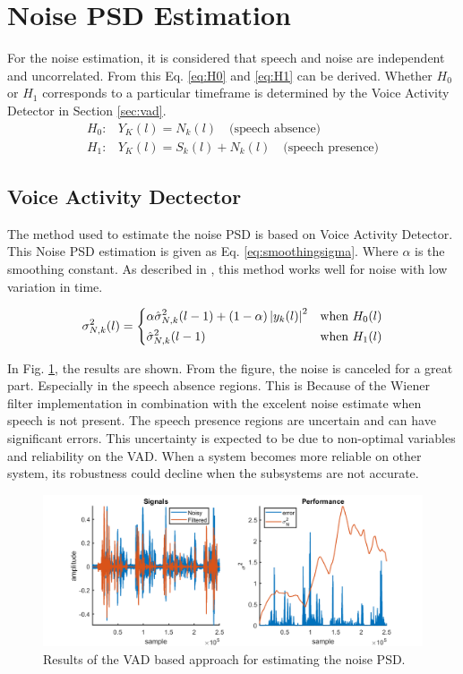 \section{Noise PSD Estimation} \label{sec:noise_estimation}
For the noise estimation, it is considered that speech and noise are independent and uncorrelated. From this Eq. \ref{eq:H0} and \ref{eq:H1} can be derived. Whether $H_0$ or $H_1$ corresponds to a particular timeframe is determined by the Voice Activity Detector in Section \ref{sec:vad}.
\begin{align}
  H_{0}: & Y_{K}(l) = N_{k}(l) \quad \text{(speech absence)}
  \label{eq:H0} \\
  H_{1}: & Y_{K}(l) = S_{k}(l) + N_{k}(l) \quad \text{(speech presence)}
  \label{eq:H1}
\end{align}

\subsection{Voice Activity Dectector}
The method used to estimate the noise PSD is based on Voice Activity Detector. This Noise PSD estimation is given as Eq. \ref{eq:smoothingsigma}. Where $\alpha$ is the smoothing constant. As described in \cite{Hendriks}, this method works well for noise with low variation in time.

\begin{equation}
  \sigma_{N,k}^{2}(l)=
  \begin{dcases}
      \alpha \hat \sigma_{N,k}^{2}(l-1) + (1-\alpha)\abs{y_{k}(l)}^{2} & \text{when } H_{0}(l)\\
      \hat \sigma_{N,k}^{2}(l-1) & \text{when } H_{1}(l)
  \end{dcases}
  \label{eq:smoothingsigma}
\end{equation}

In Fig. \ref{fig:VADnoise}, the results are shown. From the figure, the noise is canceled for a great part. Especially in the speech absence regions. This is Because of the Wiener filter implementation in combination with the excelent noise estimate when speech is not present. The speech presence regions are uncertain and can have significant errors. This uncertainty is expected to be due to non-optimal variables and reliability on the VAD. When a system becomes more reliable on other system, its robustness could decline when the subsystems are not accurate.

\begin{figure}[h]
  \centering
  \includegraphics[width=\textwidth]{images/noisepsd.png}
  \caption{Results of the VAD based approach for estimating the noise PSD.}
  \label{fig:VADnoise}
\end{figure}

